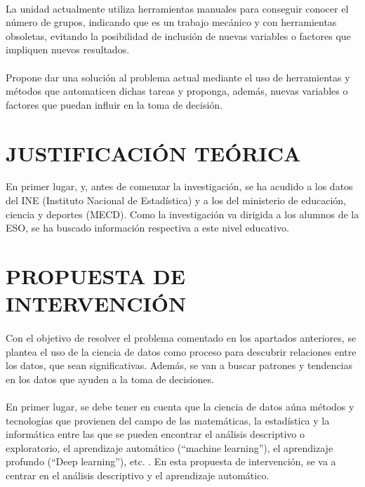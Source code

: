 \documentclass[spanish,12pt, a4paper,twoside]{paper}
\let\oldsection\section
\def\section{\cleardoublepage\oldsection}
\begin{document}
\paragraph{}
La unidad actualmente utiliza herramientas manuales para conseguir conocer el número de grupos, indicando que es un trabajo mecánico y con herramientas obsoletas, evitando la posibilidad de inclusión de nuevas variables o factores que impliquen nuevos resultados.
\paragraph{}
Propone dar una solución al problema actual mediante el uso de herramientas y métodos que automaticen dichas tareas y proponga, además, nuevas variables o factores que puedan influir en la toma de decisión. 

\section{JUSTIFICACIÓN TEÓRICA}
En primer lugar, y, antes de comenzar la investigación, se ha acudido a los datos del INE (Instituto Nacional de Estadística) y a los del ministerio de educación, ciencia y deportes (MECD).
Como la investigación va dirigida a los alumnos de la ESO, se ha buscado información respectiva a este nivel educativo. 


\section{PROPUESTA DE INTERVENCIÓN}
\paragraph{}
Con el objetivo de resolver el problema comentado en los apartados anteriores, se plantea el uso de la ciencia de datos como proceso para descubrir relaciones entre los datos, que sean significativas. Además, se van a buscar patrones y tendencias en los datos que ayuden a la toma de decisiones.
\paragraph{}
En primer lugar, se debe tener en cuenta que la ciencia de datos aúna métodos y tecnologías que provienen del campo de las matemáticas, la estadística y la informática entre las que se pueden encontrar el análisis descriptivo o exploratorio, el aprendizaje automático (“machine learning”), el aprendizaje profundo (“Deep learning”), etc. \cite{Marin2018}. En esta propuesta de intervención, se va a centrar en el análisis descriptivo y el aprendizaje automático.
\end{document}
